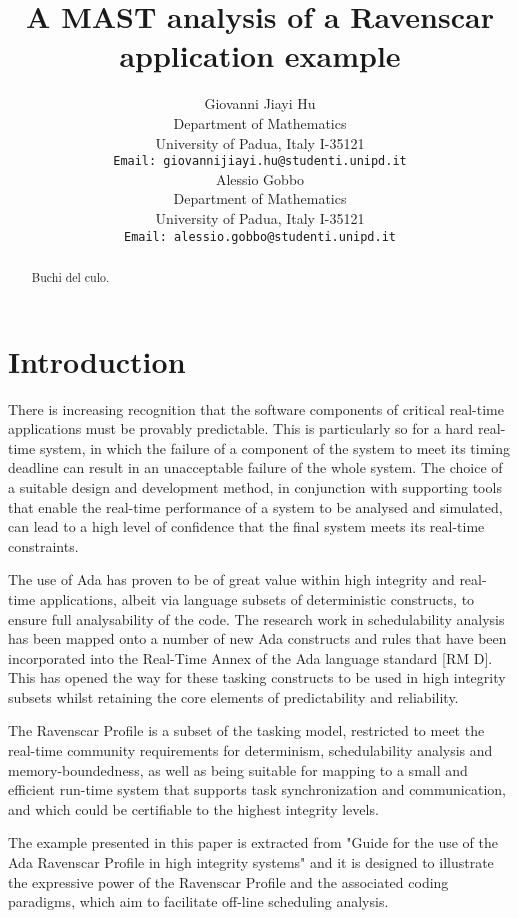 \documentclass{article}
\title{A MAST analysis of a Ravenscar application example}
\author{
  Giovanni Jiayi Hu\\
  Department of Mathematics\\
  University of Padua, Italy I-35121\\
  \texttt{Email: giovannijiayi.hu@studenti.unipd.it} \\
   \And
   Alessio Gobbo \\
   Department of Mathematics\\
   University of Padua, Italy I-35121\\
   \texttt{Email: alessio.gobbo@studenti.unipd.it} \\
}
\begin{document}
\maketitle

\begin{abstract}
Buchi del culo. \lipsum[1]
\end{abstract}



\section{Introduction}

There is increasing recognition that the software components of critical real-time applications must be provably predictable. This is particularly so for a hard real-time system, in which the failure of a component of the system to meet its timing deadline can result in an unacceptable failure of the whole system. The choice of a suitable design and development method, in conjunction with supporting tools that enable the real-time performance of a system to be analysed and simulated, can lead to a high level of confidence that the final system meets its real-time constraints.

The use of Ada has proven to be of great value within high integrity and real-time applications, albeit via language subsets of deterministic constructs, to ensure full analysability of the code. The research work in schedulability analysis has been mapped onto a number of new Ada constructs and rules that have been incorporated into the Real-Time Annex of the Ada language standard [RM D]. This has opened the way for these tasking constructs to be used in high integrity subsets whilst retaining the core elements of predictability and reliability.

The Ravenscar Profile is a subset of the tasking model, restricted to meet the real-time community requirements for determinism, schedulability analysis and memory-boundedness, as well as being suitable for mapping to a small and efficient run-time system that supports task synchronization and communication, and which could be certifiable to the highest integrity levels.

The example presented in this paper is extracted from "Guide for the use of the
Ada Ravenscar Profile in
high integrity systems" \cite{ycs} and it is designed to illustrate the expressive power of the Ravenscar Profile and the associated coding paradigms, which aim to facilitate off-line scheduling analysis.
\end{document}
